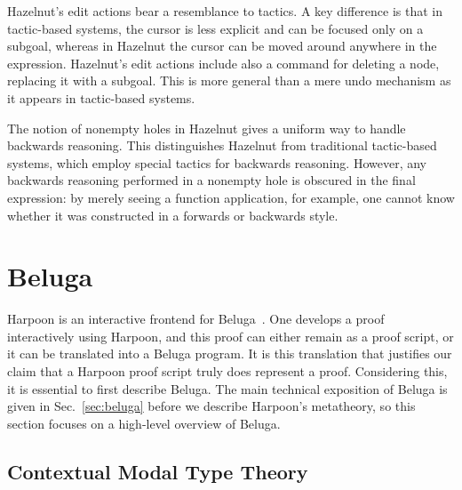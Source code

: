 Hazelnut's edit actions bear a resemblance to tactics.
A key difference is that in tactic-based systems, the cursor is less explicit and
can be focused only on a subgoal, whereas in Hazelnut the cursor can be moved
around anywhere in the expression.
Hazelnut's edit actions include also a command for deleting a node, replacing it
with a subgoal.
This is more general than a mere undo mechanism as it appears in tactic-based
systems.

The notion of nonempty holes in Hazelnut gives a uniform way to handle backwards
reasoning. This distinguishes Hazelnut from traditional tactic-based systems,
which employ special tactics for backwards reasoning.
However, any backwards reasoning performed in a nonempty hole is obscured in the
final expression: by merely seeing a function application, for example, one
cannot know whether it was constructed in a forwards or backwards style.

\section{Beluga}
\label{sec:beluga-intro}

Harpoon is an interactive frontend for Beluga~\cite{Cave:POPL12}.
One develops a proof interactively using Harpoon, and this proof can either
remain as a proof script, or it can be translated into a Beluga program.
It is this translation that justifies our claim that a Harpoon proof script
truly does represent a proof.
Considering this, it is essential to first describe Beluga.
The main technical exposition of Beluga is given in Sec.~\ref{sec:beluga}
before we describe Harpoon's metatheory, so this section focuses on a high-level
overview of Beluga.

\subsection{Contextual Modal Type Theory}

